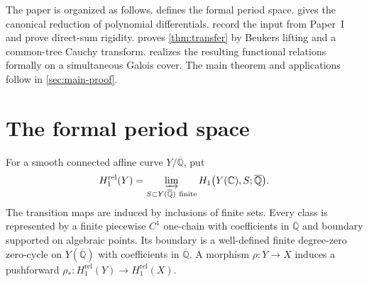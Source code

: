 \documentclass[11pt]{article}
\numberwithin{equation}{section}
\theoremstyle{definition}
\theoremstyle{remark}
\newcommand{\C}{\mathbb C}
\newcommand{\Qbar}{\overline{\mathbb Q}}
\begin{document}
The paper is organized as follows.   defines the
formal period space.   gives the canonical reduction of
polynomial differentials.   record
the input from Paper~I and prove direct-sum rigidity.
 proves \cref{thm:transfer} by Beukers lifting and a
common-tree Cauchy transform.   realizes the
resulting functional relations formally on a simultaneous Galois cover.
The main theorem and applications follow in \cref{sec:main-proof}.

\section{The formal period space}\label{sec:formal-space}

For a smooth connected affine curve $Y/\Qbar$, put
\begin{equation}\label{eq:relative-homology}
  H_1^{\mathrm{rel}}(Y)
  =\varinjlim_{S\subset Y(\Qbar)\ \mathrm{finite}}
    H_1\bigl(Y(\C),S;\Qbar\bigr).
\end{equation}
The transition maps are induced by inclusions of finite sets.  Every class
is represented by a finite piecewise $C^1$ one-chain with coefficients in
$\Qbar$ and boundary supported on algebraic points.  Its boundary is a
well-defined finite degree-zero zero-cycle on $Y(\Qbar)$ with coefficients
in $\Qbar$.  A morphism $\rho:Y\to X$ induces a pushforward
$\rho_*:H_1^{\mathrm{rel}}(Y)\to H_1^{\mathrm{rel}}(X)$.
\end{document}
